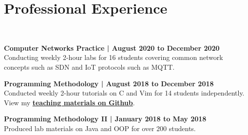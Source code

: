 \documentclass[a4paper]{deedy-resume-openfont} %
\begin{document}
\begin{minipage}[t]{0.60\textwidth} 


\section{Professional Experience}
\\
\vspace{10pt} %
\begin{tightemize}
\item {\fontsize{10}{10}\selectfont\bfseries Computer Networks Practice | August 2020 to December 2020}\\ Conducting weekly 2-hour labs for 16 students covering common network concepts such as SDN and IoT protocols such as MQTT.
\item {\fontsize{10}{10}\selectfont\bfseries Programming Methodology | August 2018 to December 2018}\\ Conducted weekly 2-hour tutorials on C and Vim for 14 students independently. View my {\bf \href{https://github.com/DigiPie/CS1010-Tutorial-C09}{teaching materials on Github}}.
\item {\fontsize{10}{10}\selectfont\bfseries Programming Methodology II | January 2018 to May 2018}\\ Produced lab materials on Java and OOP for over 200 students.
\end{tightemize}
\sectionsep


\end{minipage}
\end{document}
